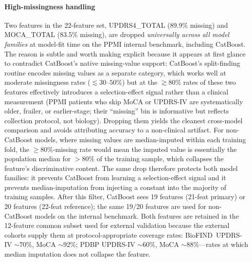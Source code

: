 \paragraph*{High-missingness handling} Two features in the 22-feature set, UPDRS4\_TOTAL (89.9\% missing) and MOCA\_TOTAL (83.5\% missing), are dropped \emph{universally across all model families} at model-fit time on the PPMI internal benchmark, including CatBoost. The reason is subtle and worth making explicit because it appears at first glance to contradict CatBoost's native missing-value support: CatBoost's split-finding routine encodes missing values as a separate category, which works well at moderate missingness rates ($\lesssim 30$--$50$\%) but at the $\gtrsim 80$\% rates of these two features effectively introduces a selection-effect signal rather than a clinical measurement (PPMI patients who skip MoCA or UPDRS-IV are systematically older, frailer, or earlier-stage; their ``missing'' bin is informative but reflects collection protocol, not biology). Dropping them yields the cleanest cross-model comparison and avoids attributing accuracy to a non-clinical artifact. For non-CatBoost models, where missing values are median-imputed within each training fold, the $\geq 80$\%-missing rate would mean the imputed value is essentially the population median for ${>}80$\% of the training sample, which collapses the feature's discriminative content. The same drop therefore protects both model families: it prevents CatBoost from learning a selection-effect signal and it prevents median-imputation from injecting a constant into the majority of training samples. After this filter, CatBoost sees 19 features (21-feat primary) or 20 features (22-feat reference); the same 19/20 features are used for non-CatBoost models on the internal benchmark. Both features are retained in the 12-feature common subset used for external validation because the external cohorts supply them at protocol-appropriate coverage rates: BioFIND~UPDRS-IV $\sim$70\%, MoCA $\sim$92\%; PDBP UPDRS-IV $\sim$60\%, MoCA $\sim$88\%---rates at which median imputation does not collapse the feature.

